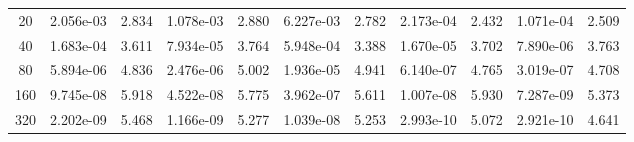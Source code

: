 \documentclass[english]{article}
\theoremstyle{thmstyleone}
\theoremstyle{thmstyletwo}
\theoremstyle{thmstylethree}
\begin{document}
\begin{table}[ht]
\begin{adjustbox}{width=1\textwidth}
\begin{subtable}{1.\linewidth}
\begin{tabular}{ccccccccccc}
				20 & 2.056e-03 & 2.834 & 1.078e-03 & 2.880 & 6.227e-03 & 2.782 & 2.173e-04 & 2.432 & 1.071e-04 & 2.509 \\
				40 & 1.683e-04 & 3.611 & 7.934e-05 & 3.764 & 5.948e-04 & 3.388 & 1.670e-05 & 3.702 & 7.890e-06 & 3.763 \\
				80 & 5.894e-06 & 4.836 & 2.476e-06 & 5.002 & 1.936e-05 & 4.941 & 6.140e-07 & 4.765 & 3.019e-07 & 4.708 \\
				160 & 9.745e-08 & 5.918 & 4.522e-08 & 5.775 & 3.962e-07 & 5.611 & 1.007e-08 & 5.930 & 7.287e-09 & 5.373 \\
				320 & 2.202e-09 & 5.468 & 1.166e-09 & 5.277 & 1.039e-08 & 5.253 & 2.993e-10 & 5.072 & 2.921e-10 & 4.641 \\
				\bottomrule
			\end{tabular}
		\end{subtable}
	\end{adjustbox}
\end{table}
\end{document}
